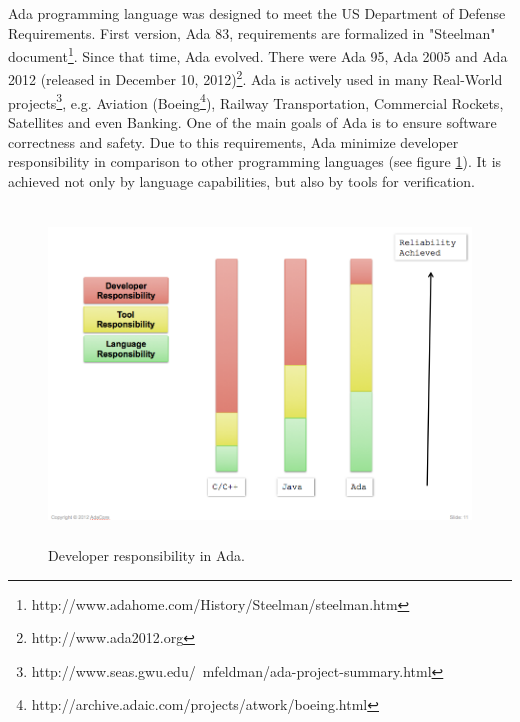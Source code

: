 Ada programming language was designed to meet the US Department of Defense Requirements. First version, Ada 83, requirements are formalized in "Steelman" document\footnote{http://www.adahome.com/History/Steelman/steelman.htm}. Since that time, Ada evolved. There were Ada 95, Ada 2005 and Ada 2012 (released in December 10, 2012)\footnote{http://www.ada2012.org}. Ada is actively used in many Real-World projects\footnote{http://www.seas.gwu.edu/~mfeldman/ada-project-summary.html}, e.g. Aviation (Boeing\footnote{http://archive.adaic.com/projects/atwork/boeing.html}), Railway Transportation, Commercial Rockets, Satellites and even Banking. One of the main goals of Ada is to ensure software correctness and safety. Due to this requirements, Ada minimize developer responsibility in comparison to other programming languages (see figure \ref{figure:developer-responsibility-in-ada}). It is achieved not only by language capabilities, but also by tools for verification. 

\begin{figure}[ht]%
    \begin{center}
    	\includegraphics[height=3.5in]{figures/developer_responsibility_in_ada.png}    	
    \end{center}
    \caption{Developer responsibility in Ada\protect\footnotemark. }
    \label{figure:developer-responsibility-in-ada}
\end{figure}


